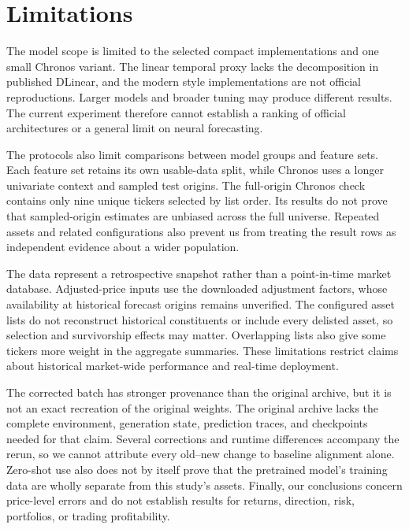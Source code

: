 \section{Limitations}

The model scope is limited to the selected compact implementations and one small Chronos variant. The linear temporal proxy lacks the decomposition in published DLinear, and the modern style implementations are not official reproductions. Larger models and broader tuning may produce different results. The current experiment therefore cannot establish a ranking of official architectures or a general limit on neural forecasting.

The protocols also limit comparisons between model groups and feature sets. Each feature set retains its own usable-data split, while Chronos uses a longer univariate context and sampled test origins. The full-origin Chronos check contains only nine unique tickers selected by list order. Its results do not prove that sampled-origin estimates are unbiased across the full universe. Repeated assets and related configurations also prevent us from treating the result rows as independent evidence about a wider population.

The data represent a retrospective snapshot rather than a point-in-time market database. Adjusted-price inputs use the downloaded adjustment factors, whose availability at historical forecast origins remains unverified. The configured asset lists do not reconstruct historical constituents or include every delisted asset, so selection and survivorship effects may matter. Overlapping lists also give some tickers more weight in the aggregate summaries. These limitations restrict claims about historical market-wide performance and real-time deployment.

The corrected batch has stronger provenance than the original archive, but it is not an exact recreation of the original weights. The original archive lacks the complete environment, generation state, prediction traces, and checkpoints needed for that claim. Several corrections and runtime differences accompany the rerun, so we cannot attribute every old--new change to baseline alignment alone. Zero-shot use also does not by itself prove that the pretrained model's training data are wholly separate from this study's assets. Finally, our conclusions concern price-level errors and do not establish results for returns, direction, risk, portfolios, or trading profitability.
